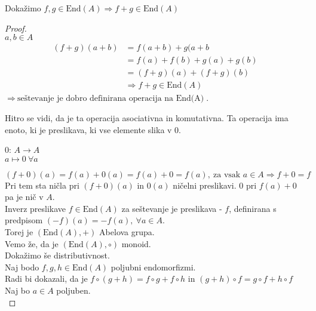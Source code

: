 \documentclass[a4paper,12pt]{article}
\begin{document}
\noindent Dokažimo $f,g\in \text{End}(A) \Rightarrow f+g\in \text{End}(A)$ \\

\begin{proof} ~\\

$a,b\in A$
\begin{align*}
(f+g)(a+b)& =f(a+b)+g(a+b \\
& =f(a)+f(b)+g(a)+g(b)\\
& =(f+g)(a)+(f+g)(b) \\
& \Rightarrow f+g\in \text{End}(A)
\end{align*}
$\Rightarrow~ \text{seštevanje je dobro definirana operacija na End(A)}$.\\

\newpage 

\noindent Hitro se vidi, da je ta operacija asociativna in komutativna. Ta operacija ima enoto, ki je preslikava, ki vse elemente slika v 0.
\begin{center}
0: $A \rightarrow A$ \\
   $a \mapsto 0~\forall a$
\end{center}
\begin{equation*}
(f+0)(a)=f(a)+0(a)=f(a)+0=f(a),~\text{za vsak $a\in A \Rightarrow f+0=f$}
\end{equation*} 
\noindent Pri tem sta ničla pri $(f+0)(a)$ in $0(a)$ ničelni preslikavi. 0 pri $f(a) + 0$ pa je nič v $A$. \\

\noindent Inverz preslikave $f\in \text{End}(A)$ za seštevanje je preslikava - $f$, definirana s predpisom $(-f)(a)=-f(a),~\forall a\in A$. \\

\noindent Torej je $(\text{End}(A),+)$ Abelova grupa.\\

\noindent Vemo že, da je $(\text{End}(A),\circ)$ monoid.\\

\noindent Dokažimo še distributivnost. \\

Naj bodo $f,g,h\in \text{End}(A)$ poljubni endomorfizmi.\\

Radi bi dokazali, da je $f\circ(g+h)=f\circ g + f \circ h$ in $(g+h)\circ f=g\circ f + h \circ f$ \\

\noindent Naj bo $a\in A$ poljuben. \\


\end{proof}
\end{document}
